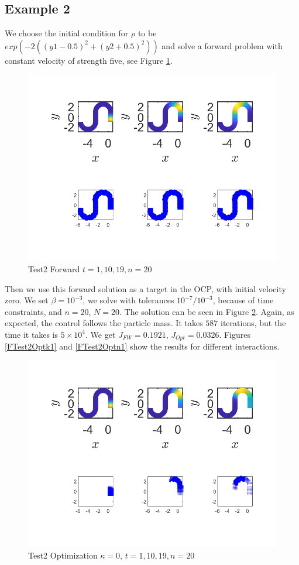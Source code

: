 \documentclass[11pt, a4paper]{article}
\theoremstyle{definition}
\begin{document}
    \subsection{Example 2}
    We choose the initial condition for $\rho$ to be $exp(-2((y1 - 0.5 )^2 + (y2 + 0.5)^2))$ and solve a forward problem with constant velocity of strength five, see Figure \ref{FTest2FW}.
    \begin{figure}[h]
    	\centering
    	\includegraphics[scale=0.7]{Test11FW.png}
    	\caption{Test2 Forward $t =1, 10, 19, n = 20$} 
    	\label{FTest2FW}
    \end{figure}
    Then we use this forward solution as a target in the OCP, with initial velocity zero. We set $\beta = 10^{-3}$, we solve with tolerances $10^{-7}/ 10^{-3}$, because of time constraints, and $n = 20$, $N = 20$. The solution can be seen in Figure \ref{FTest2Opt}. Again, as expected, the control follows the particle mass. It takes $ 587$ iterations, but the time it takes is $ 5 \times 10^4$. We get $J_{FW} =  0.1921$, $J_{Opt} =  0.0326$. Figures \ref{FTest2Optk1} and \ref{FTest2Optn1} show the results for different interactions. 
    \begin{figure}[h]
    	\centering
    	\includegraphics[scale=0.7]{Test11Opt.png}
    	\caption{Test2 Optimization $\kappa = 0$, $t =1, 10, 19, n = 20$} 
    	\label{FTest2Opt}
    \end{figure}
    
\end{document}
